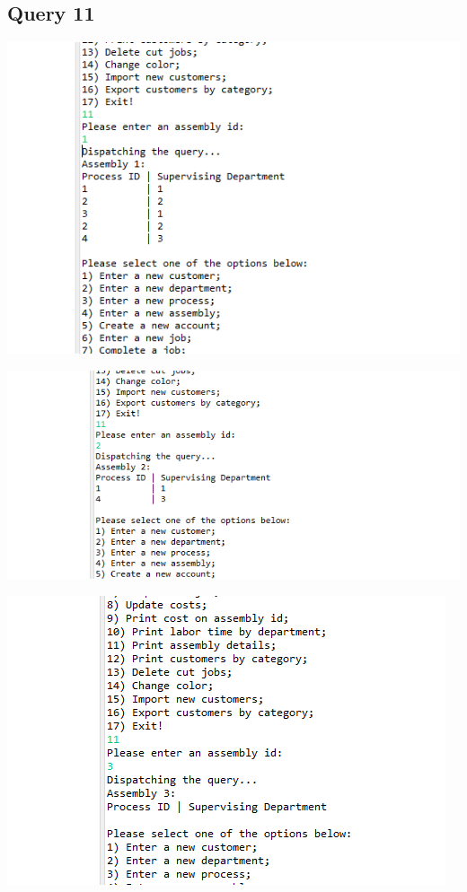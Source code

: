 \documentclass[11pt]{article}
\begin{document}
\subsection{Query 11}
\includegraphics[width = \textwidth]{assDetails1.png}

\includegraphics[width = \textwidth]{assDetails2.png}

\includegraphics[width = \textwidth]{assDetails3.png}
\end{document}
